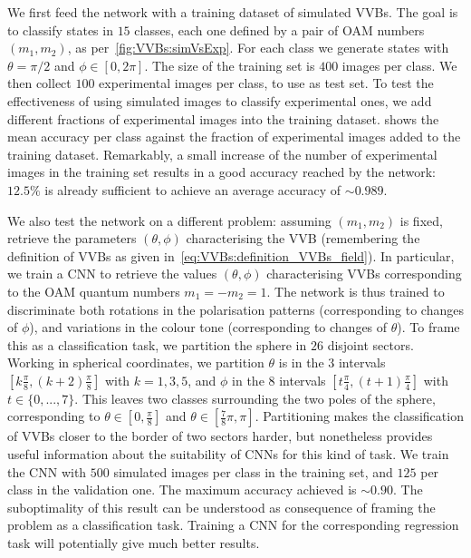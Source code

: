 We first feed the network with a training dataset of simulated \acp{VVB}. The goal is to classify states in $15$ classes, each one defined by a pair of OAM numbers $(m_1,m_2)$, as per~\cref{fig:VVBs:simVsExp}.
For each class we generate states with $\theta=\pi/2$ and $\phi\in[0,2\pi]$. The size of the training set is $400$ images per class.
We then collect $100$ experimental images per class, to use as test set.
To test the effectiveness of using simulated images to classify experimental ones, we add different fractions of experimental images into the training dataset.
 shows the mean accuracy per class against the fraction of experimental images added to the training dataset.
Remarkably, a small increase of the number of experimental images in the training set results in a good accuracy reached by the network: $12.5\%$ is already sufficient to achieve an average accuracy of $\sim 0.989$.


We also test the network on a different problem: assuming $(m_1,m_2)$ is fixed, retrieve the parameters $(\theta,\phi)$ characterising the VVB (remembering the definition of VVBs as given in~\cref{eq:VVBs:definition_VVBs_field}).
In particular, we train a CNN to retrieve the values $(\theta,\phi)$ characterising VVBs corresponding to the OAM quantum numbers $m_1=-m_2=1$.
The network is thus trained to discriminate both rotations in the polarisation patterns (corresponding to changes of $\phi$), and variations in the colour tone (corresponding to changes of $\theta$).
To frame this as a classification task, we partition the sphere in $26$ disjoint sectors.
Working in spherical coordinates, we partition $\theta$ is in the $3$ intervals $\left[k \frac{\pi}{8}, (k+2) \frac{\pi}{8}\right]$ with $k=1,3,5$, and $\phi$ in the $8$ intervals $\left[t \frac{\pi}{4}, (t+1) \frac{\pi}{4}\right]$ with $t \in \{0,...,7\}$.
This leaves two classes surrounding the two poles of the sphere, corresponding to $\theta \in \left[0, \frac{\pi}{8}\right]$ and $\theta\in\left[ \frac{7}{8} \pi, \pi\right]$.
Partitioning makes the classification of VVBs closer to the border of two sectors harder, but nonetheless provides useful information about the suitability of CNNs for this kind of task.
We train the CNN with $500$ simulated images per class in the training set, and $125$ per class in the validation one. The maximum accuracy  achieved is $\sim 0.90$.
The suboptimality of this result can be understood as consequence of framing the problem as a classification task. Training a CNN for the corresponding regression task will potentially give much better results.


